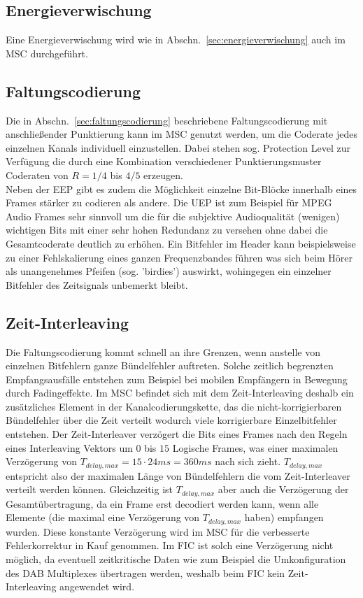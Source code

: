 \subsection{Energieverwischung}
Eine Energieverwischung wird wie in Abschn.~\ref{sec:energieverwischung} auch im \ac{MSC} durchgeführt.

\subsection{Faltungscodierung}
Die in Abschn.~\ref{sec:faltungscodierung} beschriebene Faltungscodierung mit anschließender Punktierung kann im \ac{MSC} genutzt werden, um die Coderate jedes einzelnen Kanals individuell einzustellen. Dabei stehen sog. Protection Level zur Verfügung die durch eine Kombination verschiedener Punktierungsmuster Coderaten von $R=1/4$ bis $4/5$ erzeugen.\\
Neben der \ac{EEP} gibt es zudem die Möglichkeit einzelne Bit-Blöcke innerhalb eines Frames stärker zu codieren als andere. Die \ac{UEP} ist zum Beispiel für MPEG Audio Frames sehr sinnvoll um die für die subjektive Audioqualität (wenigen) wichtigen Bits mit einer sehr hohen Redundanz zu versehen ohne dabei die Gesamtcoderate deutlich zu erhöhen. Ein Bitfehler im Header kann beispielsweise zu einer Fehlskalierung eines ganzen Frequenzbandes führen was sich beim Hörer als unangenehmes Pfeifen (sog. 'birdies') auswirkt, wohingegen ein einzelner Bitfehler des Zeitsignals unbemerkt bleibt.

\subsection{Zeit-Interleaving}
\label{sec:time_interleaving_std}
Die Faltungscodierung kommt schnell an ihre Grenzen, wenn anstelle von einzelnen Bitfehlern ganze Bündelfehler auftreten. Solche zeitlich begrenzten Empfangsausfälle entstehen zum Beispiel bei mobilen Empfängern in Bewegung durch Fadingeffekte. Im \ac{MSC} befindet sich mit dem Zeit-Interleaving deshalb ein zusätzliches Element in der Kanalcodierungskette, das die nicht-korrigierbaren Bündelfehler über die Zeit verteilt wodurch viele korrigierbare Einzelbitfehler entstehen. Der Zeit-Interleaver verzögert die Bits eines Frames nach den Regeln eines Interleaving Vektors um $0$ bis $15$ Logische Frames, was einer maximalen Verzögerung von $T_{delay, max} = 15 \cdot 24ms = 360 ms$ nach sich zieht. $T_{delay, max}$ entspricht also der maximalen Länge von Bündelfehlern die vom Zeit-Interleaver verteilt werden können.  Gleichzeitig ist $T_{delay, max}$ aber auch die Verzögerung der Gesamtübertragung, da ein Frame erst decodiert werden kann, wenn alle Elemente (die maximal eine Verzögerung von $T_{delay, max}$ haben) empfangen wurden. Diese konstante Verzögerung wird im MSC für die verbesserte Fehlerkorrektur in Kauf genommen. Im FIC ist solch eine Verzögerung nicht möglich, da eventuell zeitkritische Daten wie zum Beispiel die Umkonfiguration des DAB Multiplexes übertragen werden, weshalb beim FIC kein Zeit-Interleaving angewendet wird.

